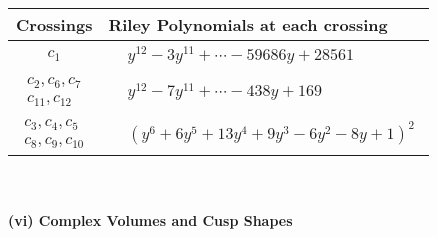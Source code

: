 \documentclass[1p]{elsarticle_modified}
\theoremstyle{definition}
\begin{document}
\begin{tabular}{m{50pt}|m{274pt}}
Crossings & \hspace{64pt}Riley Polynomials at each crossing \\
\hline $$\begin{aligned}c_{1}\end{aligned}$$&$\begin{aligned}
&y^{12}-3 y^{11}+\cdots-59686 y+28561
\end{aligned}$\\
\hline $$\begin{aligned}c_{2},c_{6},c_{7}\\c_{11},c_{12}\end{aligned}$$&$\begin{aligned}
&y^{12}-7 y^{11}+\cdots-438 y+169
\end{aligned}$\\
\hline $$\begin{aligned}c_{3},c_{4},c_{5}\\c_{8},c_{9},c_{10}\end{aligned}$$&$\begin{aligned}
&(y^6+6 y^5+13 y^4+9 y^3-6 y^2-8 y+1)^2
\end{aligned}$\\
\hline
\end{tabular}\\~\\
\newpage\flushleft \textbf{(vi) Complex Volumes and Cusp Shapes}
\end{document}
